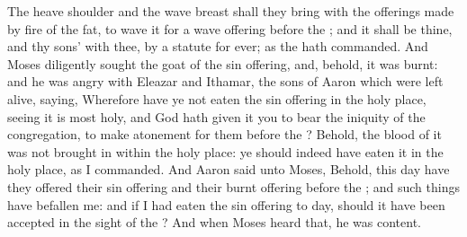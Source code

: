 \begin{biblechapter}
\verse The heave shoulder and the wave breast shall they bring with the offerings made by fire of the fat, to wave it for a wave offering before the \LORD; and it shall be thine, and thy sons' with thee, by a statute for ever; as the \LORD hath commanded.
\verse And Moses diligently sought the goat of the sin offering, and, behold, it was burnt: and he was angry with Eleazar and Ithamar, the sons of Aaron which were left alive, saying,
\verse Wherefore have ye not eaten the sin offering in the holy place, seeing it is most holy, and God hath given it you to bear the iniquity of the congregation, to make atonement for them before the \LORD?
\verse Behold, the blood of it was not brought in within the holy place: ye should indeed have eaten it in the holy place, as I commanded.
\verse And Aaron said unto Moses, Behold, this day have they offered their sin offering and their burnt offering before the \LORD; and such things have befallen me: and if I had eaten the sin offering to day, should it have been accepted in the sight of the \LORD?
\verse And when Moses heard that, he was content.
\end{biblechapter}

